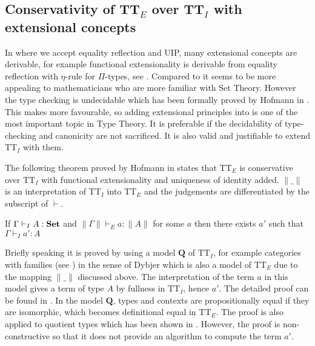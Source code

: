 \subsection{Conservativity of TT$_E$ over TT$_I$ with extensional concepts}

In \ett where we accept equality reflection and UIP, many extensional concepts are derivable, for example functional extensionality is derivable from equality reflection with $\eta$-rule for $\Pi$-types, see . Compared to \itt it seems to be more appealing to mathematicians who are more familiar with Set Theory. However the type checking is undecidable which has been formally proved by Hofmann in \cite{hof:phd}. This makes \itt more favourable, so adding extensional principles into \itt  
is one of the most important topic in Type Theory. It is preferable if the decidability of type-checking and canonicity are not sacrificed. 
It is also valid and justifiable to extend TT$_I$ with them. 

The following theorem proved by Hofmann in \cite{hof:95:con} states that TT$_E$ is conservative over TT$_I$ with functional extensionality and uniqueness of identity added. $\|\_\|$ is an interpretation of TT$_I$ into TT$_E$ and the judgements are differentiated by the subscript of $\vdash$.

\begin{theorem}
If $\Gamma \vdash_I A : \operatorname{\mathbf{Set}}$ and $\| \Gamma \| \vdash_E a : \| A \|$ for some $a$ then there exists $a'$ such that $\Gamma \vdash_I a' : A$
\end{theorem}


Briefly speaking it is proved by using a model $\mathbf{Q}$ of TT$_I$, for example categories with families (see ) in the sense of Dybjer which is also a model of TT$_E$ due to the mapping $\|\_\|$ discussed above. The interpretation of the term $a$ in this model gives a term of type $A$ by fullness in TT$_I$, hence $a'$. The detailed proof can be found in \cite{hof:95:con}. In the model $\mathbf{Q}$, types and contexts are propositionally equal if they are isomorphic, which becomes definitional equal in TT$_E$. The proof is also applied to quotient types which has been shown in \cite{hof:phd}.
However, the proof is non-constructive so that it does not provide an algorithm to compute the term $a'$.








